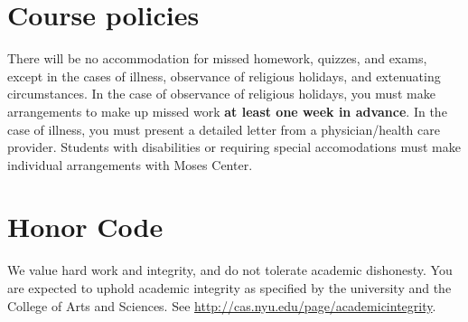 \documentclass[10pt]{article}
\theoremstyle{definition}
\begin{document}
\section*{Course policies}
There will be no accommodation for missed homework, quizzes, and exams, except in the cases of illness, observance of religious holidays, and extenuating circumstances.  In the case of observance of religious holidays, you must make arrangements to make up missed work \textbf{at least one week in advance}.  In the case of illness, you must present a detailed letter from a physician/health care provider.  Students with disabilities or requiring special accomodations must make individual arrangements with Moses Center.


\section*{Honor Code}

We value hard work and integrity, and do not tolerate academic dishonesty.  You are expected to uphold academic integrity as specified by the university and the College of Arts and Sciences.  See \url{http://cas.nyu.edu/page/academicintegrity}.  

\end{document}
